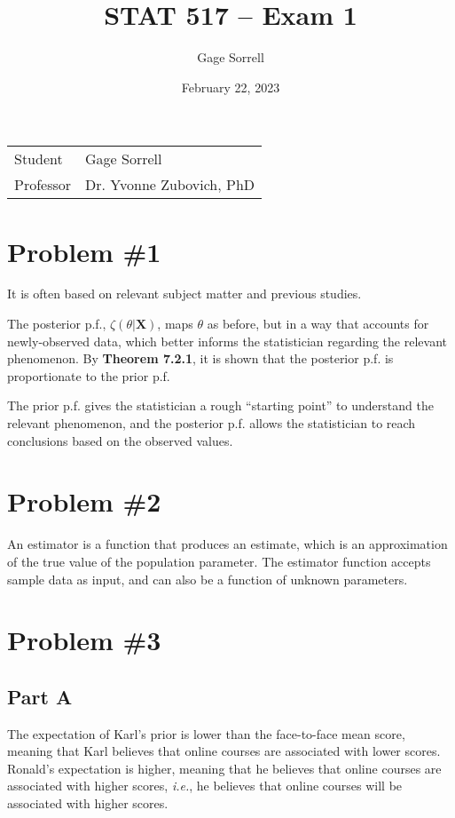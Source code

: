 \documentclass{article}
\title{STAT 517 -- Exam 1}
\author{Gage Sorrell}
\date{February 22, 2023}
\begin{document}
\maketitle

\noindent\begin{tabular}{@{}ll}
    Student & Gage Sorrell\\
    Professor &  Dr. Yvonne Zubovich, PhD\\
\end{tabular}

\doublespacing

\section*{Problem \#1}

It is often based on relevant subject matter and previous studies.

The posterior p.f., $\zeta(\theta | \mathbf{X})$, maps $\theta$ as before, but in a way that accounts for newly-observed data, which better informs the statistician regarding the relevant phenomenon.
By \textbf{Theorem 7.2.1}, it is shown that the posterior p.f. is proportionate to the prior p.f.

The prior p.f. gives the statistician a rough ``starting point'' to understand the relevant phenomenon, and the posterior p.f. allows the statistician to reach conclusions based on the observed values.

\section*{Problem \#2}

An estimator is a function that produces an estimate, which is an approximation of the true value of the population parameter.
The estimator function accepts sample data as input, and can also be a function of unknown parameters.

\section*{Problem \#3}

\subsection*{Part A}

The expectation of Karl's prior is lower than the face-to-face mean score, meaning that Karl believes that online courses are associated with lower scores.
Ronald's expectation is higher, meaning that he believes that online courses are associated with higher scores, \textit{i.e.}, he believes that online courses will be associated with higher scores.
\end{document}
